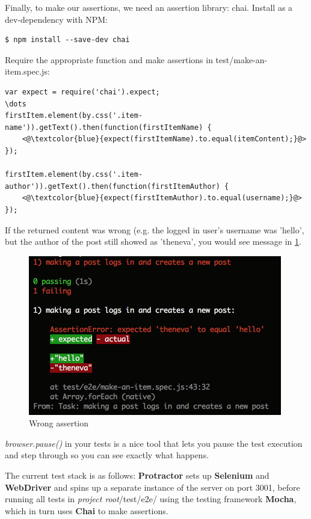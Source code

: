 \documentclass[british]{article}
\begin{document}
Finally, to make our assertions, we need an assertion library: chai. Install as a dev-dependency with NPM:

\begin{lstlisting}
$ npm install --save-dev chai
\end{lstlisting}

Require the appropriate function and make assertions in test/make-an-item.spec.js:

\begin{lstlisting}
var expect = require('chai').expect;
\dots
firstItem.element(by.css('.item-name')).getText().then(function(firstItemName) {
	<@\textcolor{blue}{expect(firstItemName).to.equal(itemContent);}@>
});

firstItem.element(by.css('.item-author')).getText().then(function(firstItemAuthor) {
	<@\textcolor{blue}{expect(firstItemAuthor).to.equal(username);}@>
});
\end{lstlisting}

If the returned content was wrong (e.g. the logged in user's username was 'hello', but the author of the post still showed as 'theneva', you would see message in \ref{fig:wrong-assertion}.

\begin{figure}[H]
    \label{fig:wrong-assertion}
    \centerline{\includegraphics[scale=0.7]{wrong-assertion}}
    \caption{Wrong assertion}
\end{figure}

\textit{browser.pause()} in your tests is a nice tool that lets you pause the test execution and step through so you can see exactly what happens.

The current test stack is as follows: \textbf{Protractor} sets up \textbf{Selenium} and \textbf{WebDriver} and spins up a separate instance of the server on port 3001,  before running all tests in \textit{project root}/test/e2e/ using the testing framework \textbf{Mocha}, which in turn uses \textbf{Chai} to make assertions.
\end{document}
